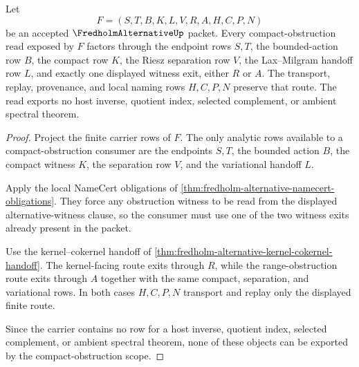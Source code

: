 \begin{theorem}
\label{thm:fredholm-alternative-compact-obstruction-scope}
Let
$$
F=(S,T,B,K,L,V,R,A,H,C,P,N)
$$
be an accepted $\FredholmAlternativeUp$ packet. Every compact-obstruction read exposed by $F$ factors through the endpoint rows $S,T$, the bounded-action row $B$, the compact row $K$, the Riesz separation row $V$, the Lax--Milgram handoff row $L$, and exactly one displayed witness exit, either $R$ or $A$. The transport, replay, provenance, and local naming rows $H,C,P,N$ preserve that route. The read exports no host inverse, quotient index, selected complement, or ambient spectral theorem.
\end{theorem}
\begin{proof}
Project the finite carrier rows of $F$. The only analytic rows available to a compact-obstruction consumer are the endpoints $S,T$, the bounded action $B$, the compact witness $K$, the separation row $V$, and the variational handoff $L$.

Apply the local NameCert obligations of \autoref{thm:fredholm-alternative-namecert-obligations}. They force any obstruction witness to be read from the displayed alternative-witness clause, so the consumer must use one of the two witness exits already present in the packet.

Use the kernel--cokernel handoff of \autoref{thm:fredholm-alternative-kernel-cokernel-handoff}. The kernel-facing route exits through $R$, while the range-obstruction route exits through $A$ together with the same compact, separation, and variational rows. In both cases $H,C,P,N$ transport and replay only the displayed finite route.

Since the carrier contains no row for a host inverse, quotient index, selected complement, or ambient spectral theorem, none of these objects can be exported by the compact-obstruction scope.
\end{proof}


